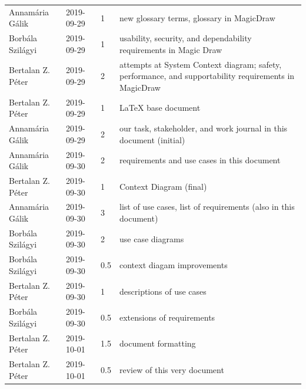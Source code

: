 \documentclass[a4paper]{article}
\begin{document}
\begin{tabularx}{\textwidth}{l l l X}
	Annamária Gálik   & 2019-09-29 & 1   & new glossary terms, glossary in
	                                       MagicDraw \\
	Borbála Szilágyi  & 2019-09-29 & 1   & usability, security, and
					       dependability requirements in
					       Magic Draw \\
	Bertalan Z. Péter & 2019-09-29 & 2   & attempts at System Context
					       diagram; safety, performance, and
					       supportability requirements in
					       MagicDraw \\
	Bertalan Z. Péter & 2019-09-29 & 1   & LaTeX base document \\
	Annamária Gálik   & 2019-09-29 & 2   & our task, stakeholder, and work
					       journal in this document
					       (initial) \\
	Annamária Gálik   & 2019-09-30 & 2   & requirements and use cases in
	                                       this document \\
	Bertalan Z. Péter & 2019-09-30 & 1   & Context Diagram (final) \\
	Annamária Gálik   & 2019-09-30 & 3   & list of use cases, list of
					       requirements (also in this
					       document) \\
	Borbála Szilágyi  & 2019-09-30 & 2   & use case diagrams \\
	Borbála Szilágyi  & 2019-09-30 & 0.5 & context diagam improvements \\
	Bertalan Z. Péter & 2019-09-30 & 1   & descriptions of use cases \\
	Borbála Szilágyi  & 2019-09-30 & 0.5 & extensions of requirements \\
	Bertalan Z. Péter & 2019-10-01 & 1.5 & document formatting \\
	Bertalan Z. Péter & 2019-10-01 & 0.5 & review of this very document \\
	\bottomrule
\end{tabularx}

\clearpage
\printglossaries
\end{document}
